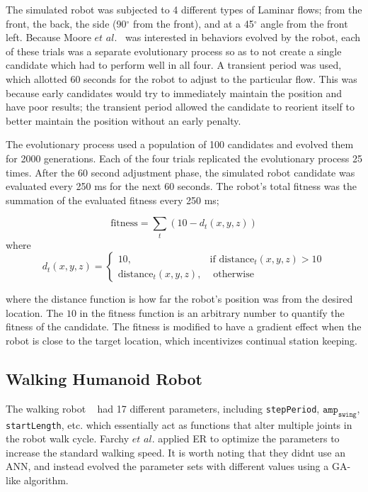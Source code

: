 \documentclass{sig-alternate}
\begin{document}
 The simulated robot was subjected to 4 different types of Laminar flows; from the front, the back, the side (90$^\circ$ from the front), and at a 45$^\circ$ angle from the front left. Because Moore $et$ $al.$~\cite{Moore:2013:ESK:2463372.2463402} was interested in behaviors evolved by the robot, each of these trials was a separate evolutionary process so as to not create a single candidate which had to perform well in all four. A transient period was used, which allotted 60 seconds for the robot to adjust to the particular flow. This was because early candidates would try to immediately maintain the position and have poor results; the transient period allowed the candidate to reorient itself to better maintain the position without an early penalty. 
 
 The evolutionary process used a population of 100 candidates and evolved them for 2000 generations. Each of the four trials replicated the evolutionary process 25 times. After the 60 second adjustment phase, the simulated robot candidate was evaluated every 250 ms for the next 60 seconds. The robot's total fitness was the summation of the evaluated fitness every 250 ms;

\begin{equation*}
	\textrm{fitness} = \sum_{t} (10 - d_t(x, y, z))
\end{equation*}
where
\[
	d_t(x, y, z) = 
		\begin{cases} 10, & \textrm{if distance}_t(x, y, z) > 10 \\
					  \textrm{distance}_t(x, y, z), & \textrm{ otherwise}
		\end{cases}
\]
 
 
  where the distance function is how far the robot's position was from the desired location. The $10$ in the fitness function is an arbitrary number to quantify the fitness of the candidate. The fitness is modified to have a gradient effect when the robot is close to the target location, which incentivizes continual station keeping.  
 
  \subsection{Walking Humanoid Robot}\label{Farchy Evolving}
  The walking robot  ~\cite{Farchy:2013:HRL:2484920.2484930} had 17 different parameters, including \texttt{stepPeriod}, $\texttt{amp}_\texttt{swing}$, \texttt{startLength}, etc. which essentially act as functions that alter multiple joints in the robot walk cycle. Farchy $et$ $al.$ applied ER to optimize the parameters to increase the standard walking speed. It is worth noting that they didnt use an ANN, and instead evolved the parameter sets with different values using a GA-like algorithm.
 
\end{document}
